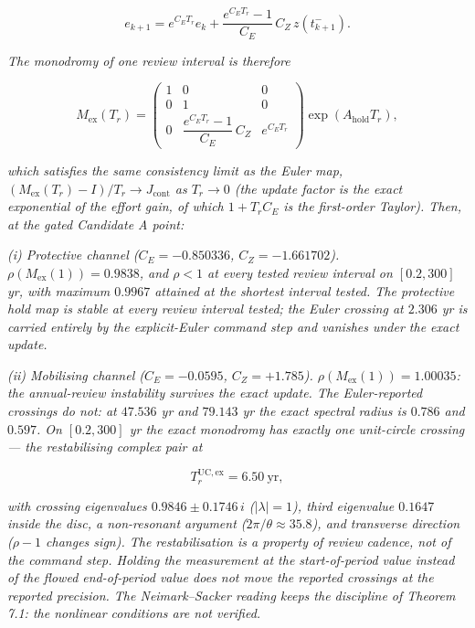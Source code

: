 \documentclass[11pt]{article}
\begin{document}
\[e_{k+1} = e^{C_E T_r} e_k + \frac{e^{C_E T_r} - 1}{C_E}\, C_Z\, z(t_{k+1}^-).\]

\emph{The monodromy of one review interval is therefore}

\[M_{\mathrm{ex}}(T_r) = \begin{pmatrix} 1 & 0 & 0 \\ 0 & 1 & 0 \\ 0 & \dfrac{e^{C_E T_r}-1}{C_E}\,C_Z & e^{C_E T_r} \end{pmatrix} \exp(A_{\mathrm{hold}} T_r), \tag{13}\]

\emph{which satisfies the same consistency limit as the Euler map,
\((M_{\mathrm{ex}}(T_r) - I)/T_r \to J_{\mathrm{cont}}\) as
\(T_r \to 0\) (the update factor is the exact exponential of the effort
gain, of which \(1 + T_r C_E\) is the first-order Taylor). Then, at the
gated Candidate A point:}

\emph{(i) Protective channel (\(C_E = -0.850336\), \(C_Z = -1.661702\)).
\(\rho(M_{\mathrm{ex}}(1)) = 0.9838\), and \(\rho < 1\) at every tested
review interval on \([0.2, 300]\) yr, with maximum \(0.9967\) attained
at the shortest interval tested. The protective hold map is stable at
every review interval tested; the Euler crossing at \(2.306\) yr is
carried entirely by the explicit-Euler command step and vanishes under
the exact update.}

\emph{(ii) Mobilising channel (\(C_E = -0.0595\), \(C_Z = +1.785\)).
\(\rho(M_{\mathrm{ex}}(1)) = 1.00035\): the annual-review instability
survives the exact update. The Euler-reported crossings do not: at
\(47.536\) yr and \(79.143\) yr the exact spectral radius is \(0.786\)
and \(0.597\). On \([0.2, 300]\) yr the exact monodromy has exactly one
unit-circle crossing --- the restabilising complex pair at}

\[T_r^{\mathrm{UC,ex}} = 6.50\ \mathrm{yr},\]

\emph{with crossing eigenvalues \(0.9846 \pm 0.1746\,i\)
(\(|\lambda| = 1\)), third eigenvalue \(0.1647\) inside the disc, a
non-resonant argument (\(2\pi/\theta \approx 35.8\)), and transverse
direction (\(\rho - 1\) changes sign). The restabilisation is a property
of review cadence, not of the command step. Holding the measurement at
the start-of-period value instead of the flowed end-of-period value does
not move the reported crossings at the reported precision. The
Neimark--Sacker reading keeps the discipline of Theorem 7.1: the
nonlinear conditions are not verified.}
\end{document}
